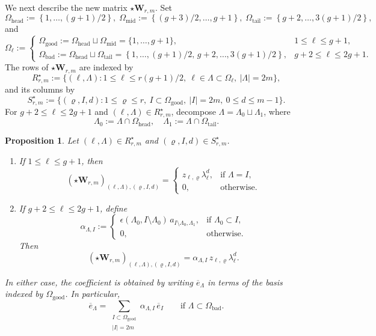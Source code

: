 \documentclass[12pt, letterpaper]{amsart}
\newtheorem{proposition}[theorem]{Proposition}
\theoremstyle{definition}
\newcommand{\bW}{\mathbf{W} }
\newcommand{\Om}{\Omega}
\newcommand{\lbd}{\lambda}
\begin{document}
We next describe the new matrix \(\star\bW_{r,m}\). Set
\[
\Om_{\mathrm{head}}:=\left\{1,\dots, (g+1)/2\right\},\;\Om_{\mathrm{mid}}:=\left\{(g+3)/2, \dots,g+1\right\},\;\Om_{\mathrm{tail}}:=\left\{g+2,\dots,3(g+1)/2\right\},
\]
and
\[
\Om_\ell:= \begin{cases}
  \Om_{\mathrm{good}}:=\Om_{\mathrm{head}}\sqcup\Om_{\mathrm{mid}}=\{1,\dots,g+1\}, & 1\le\ell\le g+1,\\[4pt]
  \Om_{\mathrm{bad}}:=\Om_{\mathrm{head}}\sqcup\Om_{\mathrm{tail}}=\left\{1,\dots,(g+1)/2,\,g+2,\dots,3(g+1)/2\right\}, & g+2\le\ell\le 2g+1.
\end{cases}
\]
The rows of \(\star\bW_{r,m}\) are indexed by
\[R_{r,m}^\star:=\{(\ell,\Lambda):1\le\ell\le r(g+1)/2,\ \ell\in\Lambda\subset\Om_\ell,\ |\Lambda|=2m\},\]
and its columns by
\[S_{r,m}^\star:=\{(\varrho,I,d):1\le\varrho\le r,\ I\subset\Om_{\mathrm{good}},\ |I|=2m,\ 0\le d\le m-1\}.\]
For \(g+2\le\ell\le2g+1\) and \((\ell,\Lambda)\in R_{r,m}^\star\), decompose \(\Lambda=\Lambda_0\sqcup\Lambda_1\), where
\[\Lambda_0:=\Lambda\cap\Om_{\mathrm{head}},\quad\Lambda_1:=\Lambda\cap\Om_{\mathrm{tail}}.\]

\begin{proposition}\label{prop:modified_entry}
Let \((\ell,\Lambda)\in R_{r,m}^\star\) and \((\varrho,I,d)\in S_{r,m}^\star\).

\begin{enumerate}
  \item If \(1\le\ell\le g+1\), then
  \[(\star\bW_{r,m})_{(\ell,\Lambda),(\varrho,I,d)}= \begin{cases} z_{\ell,\varrho}\lbd_\ell^d, &\text{if }\Lambda=I,\\ 0, & \text{otherwise}. \end{cases}\]
  \item If \(g+2\le \ell\le 2g+1\), define
  \[
  \alpha_{\Lambda,I}:= \begin{cases}
    \epsilon(\Lambda_0,I\setminus\Lambda_0)\,a_{I\setminus\Lambda_0,\Lambda_1}, & \text{if }\Lambda_0\subset I,\\[4pt]
    0, & \text{otherwise}.
  \end{cases}
  \]
  Then
  \[(\star\bW_{r,m})_{(\ell,\Lambda),(\varrho,I,d)}=\alpha_{\Lambda,I}\,z_{\ell,\varrho}\lbd_\ell^d.\]
\end{enumerate}
In either case, the coefficient is obtained by writing \(\overline e_\Lambda\) in terms of the basis indexed by \(\Om_{\mathrm{good}}\). In particular,
\[\overline e_\Lambda=\sum_{\substack{I\subset\Om_{\mathrm{good}}\\|I|=2m}}\alpha_{\Lambda,I}\,\overline e_I\qquad\text{if }\Lambda\subset\Om_{\mathrm{bad}}.\]
\end{proposition}
\end{document}
